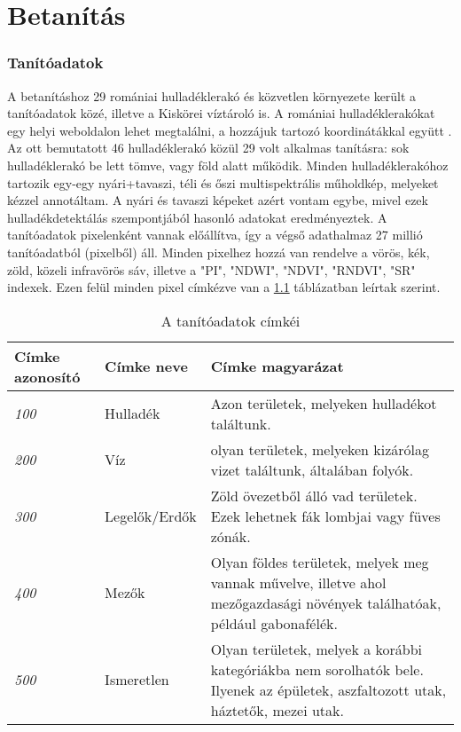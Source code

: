\chapter{Betanítás}
\label{ch:training}

\subsection{Tanítóadatok}

A betanításhoz 29 romániai hulladéklerakó és közvetlen környezete került a tanítóadatok közé, illetve a Kiskörei víztároló is. A romániai hulladéklerakókat egy helyi weboldalon lehet megtalálni, a hozzájuk tartozó koordinátákkal együtt \cite{wasteromania2019}. Az ott bemutatott 46 hulladéklerakó közül 29 volt alkalmas tanításra: sok hulladéklerakó be lett tömve, vagy föld alatt működik. Minden hulladéklerakóhoz tartozik egy-egy nyári+tavaszi, téli és őszi multispektrális műholdkép, melyeket kézzel annotáltam. A nyári és tavaszi képeket azért vontam egybe, mivel ezek hulladékdetektálás szempontjából hasonló adatokat eredményeztek. A tanítóadatok pixelenként vannak előállítva, így a végső adathalmaz 27 millió tanítóadatból (pixelből) áll. Minden pixelhez hozzá van rendelve a vörös, kék, zöld, közeli infravörös sáv, illetve a "PI", "NDWI", "NDVI", "RNDVI", "SR" indexek. Ezen felül minden pixel címkézve van a \ref{tab:waste-detection-labels} táblázatban leírtak szerint.

\begin{table}[H]
	\centering
	\begin{tabular}{ | p{} | p{} | p{} | }
		\hline
		\textbf{Címke azonosító} & \textbf{Címke neve} & \textbf{Címke magyarázat} \\
		\hline \hline
		\emph{100} & Hulladék & Azon területek, melyeken hulladékot találtunk. \\
		\hline
		\emph{200} & Víz & olyan területek, melyeken kizárólag vizet találtunk, általában folyók. \\
		\hline
		\emph{300} & Legelők/Erdők & Zöld övezetből álló vad területek. Ezek lehetnek fák lombjai vagy füves zónák. \\
		\hline
        \emph{400} & Mezők & Olyan földes területek, melyek meg vannak művelve, illetve ahol mezőgazdasági növények találhatóak, például gabonafélék. \\
		\hline
        \emph{500} & Ismeretlen & Olyan területek, melyek a korábbi kategóriákba nem sorolhatók bele. Ilyenek az épületek, aszfaltozott utak, háztetők, mezei utak. \\
		\hline
	\end{tabular}
	\caption{A tanítóadatok címkéi}
	\label{tab:waste-detection-labels}
\end{table}

